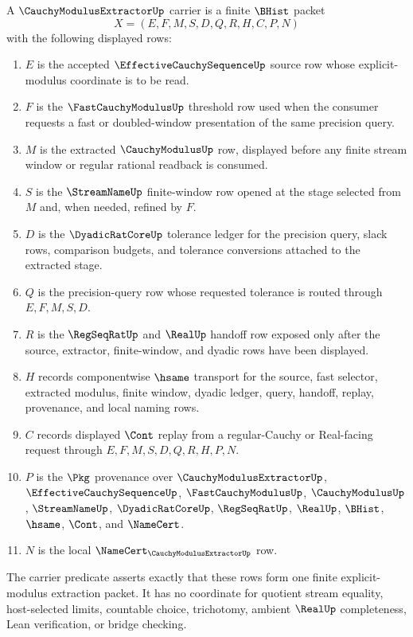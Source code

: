 \begin{definition}\label{def:cauchy-modulus-extractor-carrier}
A $\CauchyModulusExtractorUp$ carrier is a finite $\BHist$ packet
$$
X=(E,F,M,S,D,Q,R,H,C,P,N)
$$
with the following displayed rows:
\begin{enumerate}
\item $E$ is the accepted $\EffectiveCauchySequenceUp$ source row whose explicit-modulus coordinate is to be read.
\item $F$ is the $\FastCauchyModulusUp$ threshold row used when the consumer requests a fast or doubled-window presentation of the same precision query.
\item $M$ is the extracted $\CauchyModulusUp$ row, displayed before any finite stream window or regular rational readback is consumed.
\item $S$ is the $\StreamNameUp$ finite-window row opened at the stage selected from $M$ and, when needed, refined by $F$.
\item $D$ is the $\DyadicRatCoreUp$ tolerance ledger for the precision query, slack rows, comparison budgets, and tolerance conversions attached to the extracted stage.
\item $Q$ is the precision-query row whose requested tolerance is routed through $E,F,M,S,D$.
\item $R$ is the $\RegSeqRatUp$ and $\RealUp$ handoff row exposed only after the source, extractor, finite-window, and dyadic rows have been displayed.
\item $H$ records componentwise $\hsame$ transport for the source, fast selector, extracted modulus, finite window, dyadic ledger, query, handoff, replay, provenance, and local naming rows.
\item $C$ records displayed $\Cont$ replay from a regular-Cauchy or Real-facing request through $E,F,M,S,D,Q,R,H,P,N$.
\item $P$ is the $\Pkg$ provenance over $\CauchyModulusExtractorUp$, $\EffectiveCauchySequenceUp$, $\FastCauchyModulusUp$, $\CauchyModulusUp$, $\StreamNameUp$, $\DyadicRatCoreUp$, $\RegSeqRatUp$, $\RealUp$, $\BHist$, $\hsame$, $\Cont$, and $\NameCert$.
\item $N$ is the local $\NameCert_{\CauchyModulusExtractorUp}$ row.
\end{enumerate}
The carrier predicate asserts exactly that these rows form one finite explicit-modulus extraction packet. It has no coordinate for quotient stream equality, host-selected limits, countable choice, trichotomy, ambient $\RealUp$ completeness, Lean verification, or bridge checking.
\end{definition}

